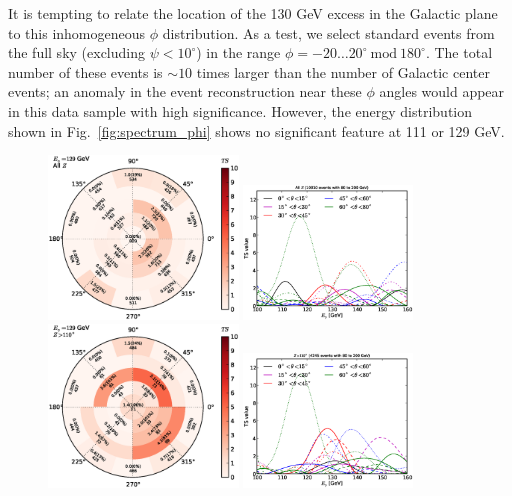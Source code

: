 \documentclass[aps,twocolumn,prd,superscriptaddress,showpacs,nofootinbib,fixfloat]{revtex4}
\begin{document}
It is tempting to relate the location of the 130 GeV excess
in the Galactic plane to this inhomogeneous $\phi$
distribution. As a test, we select standard events from the
full sky (excluding $\psi < 10^\circ$) in the range $\phi=
-20\dots20^\circ\ \text{mod}\ 180^\circ$. The total number
of these events is $\sim10$ times larger than the number of
Galactic center events; an anomaly in the event
reconstruction near these $\phi$ angles would appear in
this data sample with high significance.  However, the
energy distribution shown in Fig.~\ref{fig:spectrum_phi}
shows no significant feature at 111 or 129 GeV.

\begin{figure}
  \centering
  \includegraphics[width=0.45\textwidth]{plots/polar_all.eps}
  \includegraphics[width=0.40\textwidth]{plots/scan_all.eps}
  \includegraphics[width=0.45\textwidth]{plots/polar_z.GT.110.eps}
  \includegraphics[width=0.40\textwidth]{plots/scan_z.GT.110.eps}

\end{figure}
\end{document}
